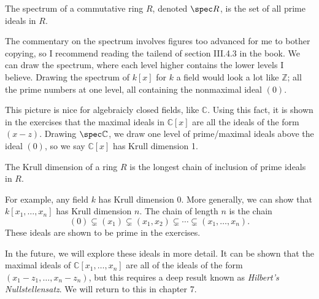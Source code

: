 \begin{definition}[Spectrum]\label{dfn:3.4.5}
	The spectrum of a commutative ring $R$, denoted $\spec R$, is the set of all prime ideals in $R$.
\end{definition}

The commentary on the spectrum involves figures too advanced for me to bother copying, so I recommend reading the tailend of section III.4.3 in the book. We can draw the spectrum, where each level higher contains the lower levels I believe. Drawing the spectrum of $k[x]$ for $k$ a field would look a lot like $\mathbb{Z}$; all the prime numbers at one level, all containing the nonmaximal ideal $(0)$.

This picture is nice for algebraicly closed fields, like $\mathbb{C}$. Using this fact, it is shown in the exercises that the maximal ideals in $\mathbb{C}[x]$ are all the ideals of the form $(x-z)$. Drawing $\spec\mathbb{C}$, we draw one level of prime/maximal ideals above the ideal $\left( 0 \right) $, so we say $\mathbb{C}[x]$ has Krull dimension 1.

\begin{definition}\label{dfn:3.3.6}
	The Krull dimension of a ring $R$ is the longest chain of inclusion of prime ideals in $R$.
\end{definition}

For example, any field $k$ has Krull dimension $0$. More generally, we can show that $k[x_1, \dots, x_n ]$ has Krull dimension $n$. The chain of length $n$ is the chain
\[
	(0) \subsetneq (x_1)\subsetneq (x_1,x_2)\subsetneq \cdots \subsetneq (x_1, \dots, x_n )
.\]
These ideals are shown to be prime in the exercises.

In the future, we will explore these ideals in more detail. It can be shown that the maximal ideals of $\mathbb{C}[x_1, \dots, x_n ]$ are all of the ideals of the form $(x_1-z_1, \ldots, x_n-z_n)$, but this requires a deep result known as \emph{Hilbert's Nullstellensatz}. We will return to this in chapter 7.
